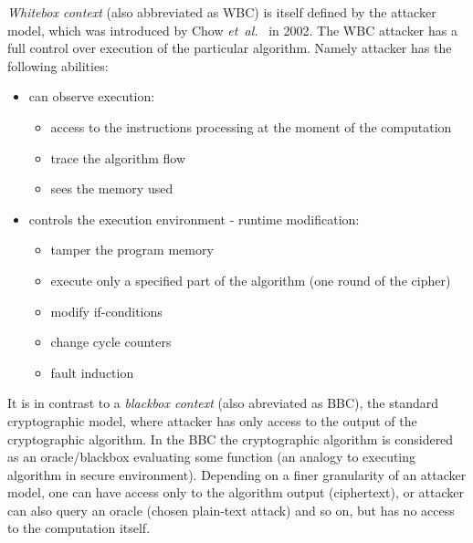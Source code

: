 \documentclass[11pt,oneside,final]{fithesis2}
\begin{document}
    
% 

    \emph{Whitebox context} (also abbreviated as WBC) is itself defined by the attacker model, which was introduced by Chow \emph{et~al.}~\citep{Chow02white-boxcryptography} in 2002.
    The WBC attacker has a full control over execution of the particular algorithm. Namely attacker has the following abilities:
    
    \begin{itemize}
	\item can observe execution:
	\begin{itemize}
	    \item access to the instructions processing at the moment of the computation
	    \item trace the algorithm flow
	    \item sees the memory used
	\end{itemize}
	\item controls the execution environment - runtime modification:
	\begin{itemize}
	    \item tamper the program memory
	    \item execute only a specified part of the algorithm (one round of the cipher)
	    \item modify if-conditions
	    \item change cycle counters
	    \item fault induction
	\end{itemize}
    \end{itemize}
    
    It is in contrast to a \emph{blackbox context} (also abreviated as BBC), the standard cryptographic model, where attacker has only access to the output of the cryptographic algorithm. 
    In the BBC the cryptographic algorithm is considered as an oracle/blackbox evaluating some function (an analogy to executing algorithm in secure environment).
    Depending on a finer granularity of an attacker model, one can have 
    access only to the algorithm output (ciphertext), or attacker can also query an oracle (chosen plain-text attack) and so on, but has no access to the computation itself.
\end{document}
